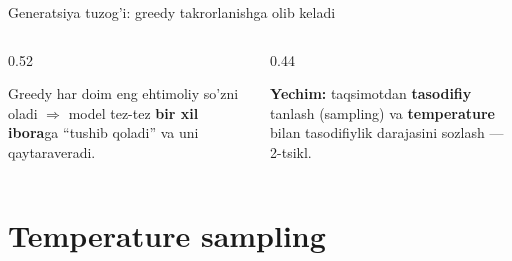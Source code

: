 \documentclass[aspectratio=169,11pt]{beamer}
\begin{document}
\begin{frame}{Generatsiya tuzog'i: greedy takrorlanishga olib keladi}
  \begin{columns}[T]
    \begin{column}{0.52\textwidth}
      \begin{tcolorbox}[warnbox,title=Takrorlanish halqasi]
        \small
        Greedy har doim eng ehtimoliy so'zni oladi $\Rightarrow$ model tez-tez
        \textbf{bir xil ibora}ga ``tushib qoladi'' va uni qaytaraveradi.
      \end{tcolorbox}
    \end{column}
    \begin{column}{0.44\textwidth}
      \begin{tcolorbox}[okbox,top=2pt,bottom=2pt]
        \footnotesize
        \textbf{Yechim:} taqsimotdan \textbf{tasodifiy} tanlash (sampling) va
        \textbf{temperature} bilan tasodifiylik darajasini sozlash --- 2-tsikl.
      \end{tcolorbox}
    \end{column}
  \end{columns}
\end{frame}

\section[Temperature]{Temperature sampling}
\end{document}
